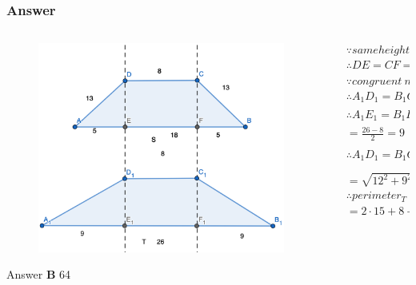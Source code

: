 \documentclass[
	11pt, %
]{beamer}
\begin{document}


\begin{frame}
	\frametitle{Answer}
	\begin{columns}[t] 

		\begin{column}{0.5\textwidth} %
		  \pause
			\begin{figure}
				\includegraphics[width=\linewidth]{Trapezoid_Question1_1.png}
			\end{figure}
		 	 Answer \textbf{B} 64
		\end{column}

		\begin{column}{0.5\textwidth} %
			\begin{equation*}
				\begin{aligned}
					&\because same height\\
					& \therefore DE = CF = D_1E_1 = C_1F_1 =12\\
					&\because congruent\ nonparallel\ sides\\
					&\therefore  A_1D_1  = B_1C_1\\
					&\therefore A_1E_1  = B_1F_1 = \frac{A_1B_1 - C_1D_1}{2}\\
					&=\frac{26 - 8}{2}=9\\
					& \therefore A_1D_1 =B_1C_1= \sqrt{D_1E_1^2 + A_1E_1^2}\\
					&= \sqrt{12^2 + 9^2}= 15\\
				  &\therefore perimeter_T = 2A_1D_1 + D_1C_1 + A_1 + B_1\\
				  &= 2\cdot 15 + 8 + 26 = 64
				\end{aligned}
			\end{equation*}	
		\end{column}

	\end{columns}
\end{frame}
\end{document}
